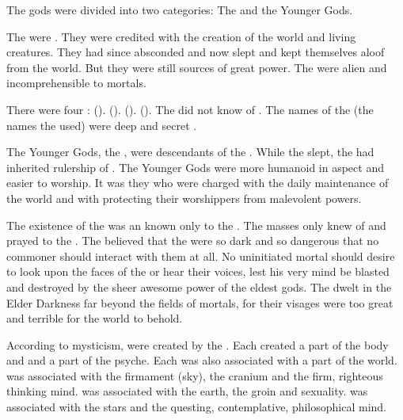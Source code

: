   The \rethyax gods were divided into two categories: 
  The \Primordials and the Younger Gods. 
  
  The \Primordials were \xss.
  They were credited with the creation of the world and living creatures.
  They had since absconded and now slept and kept themselves aloof from the world. 
  But they were still sources of great power. 
  The \Primordials were alien and incomprehensible to mortals. 
  
  There were four \Primordials:
    \Costorul (\KhothSell).
    \Kythraxas (\KyaethemChreiAz). 
    \Nelxurra (\NerranKoss). 
    \Rammasul (\NaathKurRamalech). 
  The \Ortaicans did not know of \RuinSatha. 
  The  names of the \Primordials (the names the \dragons used) were deep and secret \arcana.
  
  The Younger Gods, the \Taorthae, were descendants of the \Primordials.
  While the \Primordials slept, the \Taorthae had inherited rulership of \Miith.
  The Younger Gods were more humanoid in aspect and easier to worship. 
  It was they who were charged with the daily maintenance of the world and with protecting their worshippers from malevolent powers.
  
  The existence of the \Primordials was an \arcanum known only to the \rethyaxes. 
  The masses only knew of and prayed to the \Taorthae. 
  The \rethyaxes believed that the \Primordials were so dark and so dangerous that no commoner should interact with them at all. 
  No uninitiated mortal should desire to look upon the faces of the \Primordials or hear their voices, lest his very mind be blasted and destroyed by the sheer awesome power of the eldest gods. 
  The \Primordials dwelt in the Elder Darkness far beyond the fields of mortals, for their visages were too great and terrible for the world to behold. 

  
  According to \rethyax mysticism, \scathae were created by the \Primordials.
  Each \Primordial created a part of the body and and a part of the \scathaese psyche. 
  Each was also associated with a part of the world. 
  \Rammasul was associated with the firmament (sky), the cranium and the firm, righteous thinking mind. 
  \Costorul was associated with the earth, the groin and sexuality. 
  \Nelxurra was associated with the stars and the questing, contemplative, philosophical mind. 
  
